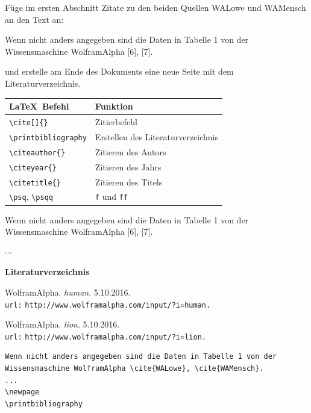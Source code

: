 \documentclass["WS\space 16-17\space -\space LaTeX-Kurs\space -\space Praesentation\space -\space 3.tex"]{subfiles}
\begin{document}
\begin{frame}[fragile]
	\begin{Aufgabe}
		Füge im ersten Abschnitt  Zitate zu den beiden Quellen \textrm{WALowe} und \textrm{WAMensch} an den Text an:
		\begin{outputbox}
			Wenn nicht anders angegeben sind die Daten in Tabelle 1 von der Wissensmaschine WolframAlpha [6], [7].
		\end{outputbox}
		und erstelle am Ende des Dokuments eine neue Seite mit dem Literaturverzeichnis.
	\end{Aufgabe}
	\btVFill\Befehle
	\begin{center}
		\begin{tabular}{ll}
			\toprule
			\LaTeX\ Befehl							&	Funktion					\\ \midrule
			\lstinline|\cite[]{}|					&	Zitierbefehl\\
			\lstinline|\printbibliography|			&	Erstellen des Literaturverzeichnis\\
			\lstinline|\citeauthor{}|				&	Zitieren des Autors \\
			\lstinline|\citeyear{}|					&	Zitieren des Jahrs \\
			\lstinline|\citetitle{}|				&	Zitieren des Titels \\
			\lstinline|\psq|, \lstinline|\psqq|		&	\texttt{f} und \texttt{ff} \\
			\bottomrule
		\end{tabular}
	\end{center}
	\vspace{0.1cm}
\end{frame}
\begin{frame}[fragile]
	\Losung
	\begin{outputbox}
		Wenn nicht anders angegeben sind die Daten in Tabelle 1 von der Wissensmaschine WolframAlpha [6], [7].
	\end{outputbox}
	\linebreakrule\vspace{-0.3cm}
	$\cdots$
	\linebreakrule
	\begin{outputbox}
		{\LARGE \textbf{Literaturverzeichnis}}
		
		\makebox[1cm]{$[6]$} WolframAlpha. \textit{human}. 5.10.2016.\\
		\makebox[1cm]{} \texttt{url:} \lstinline|http://www.wolframalpha.com/input/?i=human.|
		
		\makebox[1cm]{$[7]$} WolframAlpha. \textit{lion}. 5.10.2016.\\
		\makebox[1cm]{} \texttt{url:} \lstinline|http://www.wolframalpha.com/input/?i=lion.|
	\end{outputbox}
	\Code
	\begin{lstlisting}
Wenn nicht anders angegeben sind die Daten in Tabelle 1 von der Wissensmaschine WolframAlpha \cite{WALowe}, \cite{WAMensch}.
...
\newpage
\printbibliography
	\end{lstlisting}
\end{frame}
\end{document}
